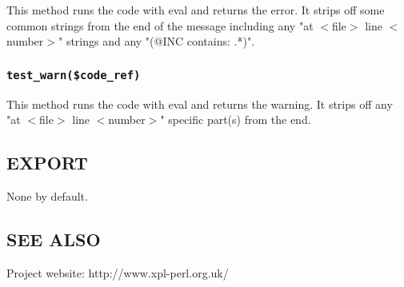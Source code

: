 \documentclass[12pt,a4paper]{article}
\begin{document}
This method runs the code with eval and returns the error.  It strips
off some common strings from the end of the message including any "at
$<$file$>$ line $<$number$>$" strings and any "(@INC contains: .*)".

\subsubsection*{\texttt{test\_warn(\$code\_ref)}\label{t::Helpers_test_warn_code_ref_}}


This method runs the code with eval and returns the warning.  It strips
off any "at $<$file$>$ line $<$number$>$" specific part(s) from the end.

\subsection*{EXPORT\label{t::Helpers_EXPORT}}


None by default.

\subsection*{SEE ALSO\label{t::Helpers_SEE_ALSO}}


Project website: http://www.xpl-perl.org.uk/

\end{document}
